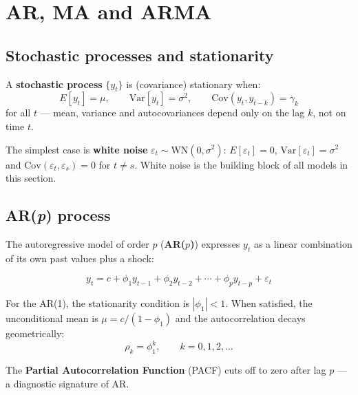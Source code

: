 \chapter{AR, MA and ARMA}
\label{cap:arma}

\section{Stochastic processes and stationarity}

A \textbf{stochastic process} $\{y_t\}$ is (covariance) stationary when:
\[
  E[y_t] = \mu, \qquad
  \mathrm{Var}[y_t] = \sigma^2, \qquad
  \mathrm{Cov}(y_t, y_{t-k}) = \gamma_k
\]
for all $t$ --- mean, variance and autocovariances depend only on the
lag $k$, not on time $t$.

The simplest case is \textbf{white noise} $\varepsilon_t \sim
\mathrm{WN}(0, \sigma^2)$: $E[\varepsilon_t] = 0$, $\mathrm{Var}[\varepsilon_t]
= \sigma^2$ and $\mathrm{Cov}(\varepsilon_t, \varepsilon_s) = 0$ for $t \neq
s$. White noise is the building block of all models in this section.

\section{AR(\textit{p}) process}

The autoregressive model of order $p$ (\textbf{AR($p$)}) expresses $y_t$
as a linear combination of its own past values plus a shock:

\[
  y_t = c + \phi_1 y_{t-1} + \phi_2 y_{t-2} + \cdots + \phi_p y_{t-p}
        + \varepsilon_t
\]

For the AR(1), the stationarity condition is $|\phi_1| < 1$. When
satisfied, the unconditional mean is $\mu = c / (1 - \phi_1)$ and the
autocorrelation decays geometrically:
\[
  \rho_k = \phi_1^k, \qquad k = 0, 1, 2, \ldots
\]

The \textbf{Partial Autocorrelation Function} (PACF) cuts off to zero after
lag $p$ --- a diagnostic signature of AR.

